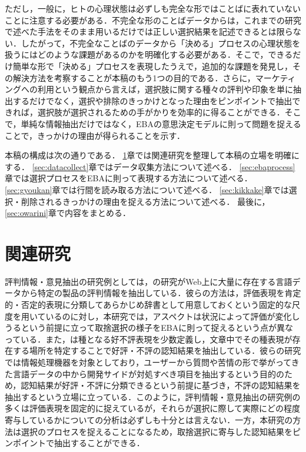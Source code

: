 \documentclass[japanese]{jnlp_1.3a}
\begin{document}
ただし，一般に，ヒトの心理状態は必ずしも完全な形ではことばに表れていないことに注意する必要がある．不完全な形のことばデータからは，これまでの研究で述べた手法をそのまま用いるだけでは正しい選択結果を記述できるとは限らない．したがって，不完全なことばのデータから「決める」プロセスの心理状態を扱うにはどのような課題があるのかを明確化する必要がある．そこで，できるだけ簡単な形で「決める」プロセスを表現したうえで，追加的な課題を発見し，その解決方法を考察することが本稿のもう1つの目的である．さらに，マーケティングへの利用という観点から言えば，選択肢に関する種々の評判や印象を単に抽出するだけでなく，選択や排除のきっかけとなった理由をピンポイントで抽出できれば，選択肢が選択されるための手がかりを効率的に得ることができる．そこで，単純な情報抽出だけではなく，EBAの意思決定モデルに則って問題を捉えることで，きっかけの理由が得られることを示す．

本稿の構成は次の通りである．
\ref{sec:kanren}章では関連研究を整理して本稿の立場を明確にする．
\ref{sec:datacollect}章ではデータ収集方法について述べる．
\ref{sec:ebaprocess}章では選択プロセスをEBAに則って表現する方法について述べる．
\ref{sec:gyoukan}章では行間を読み取る方法について述べる．
\ref{sec:kikkake}章では選択・削除されるきっかけの理由を捉える方法について述べる．
最後に，\ref{sec:owarini}章で内容をまとめる．

\section{関連研究}
\label{sec:kanren}

評判情報・意見抽出の研究例としては，の研究がWeb上に大量に存在する言語データから特定の製品の評判情報を抽出している．彼らの方法は，評価表現を肯定的・否定的表現に分類してあらかじめ辞書として用意しておくという固定的な尺度を用いているのに対し，本研究では，アスペクトは状況によって評価が変化しうるという前提に立って取捨選択の様子をEBAに則って捉えるという点が異なっている．また，は種となる好不評表現を少数定義し，文章中でその種表現が存在する場所を特定することで好評・不評の認知結果を抽出している．彼らの研究では情報処理機器を対象としており，ユーザーから質問や苦情の形で挙がってきた言語データの中から開発サイドが対処すべき項目を抽出するという目的のため，認知結果が好評・不評に分類できるという前提に基づき，不評の認知結果を抽出するという立場に立っている．このように，評判情報・意見抽出の研究例の多くは評価表現を固定的に捉えているが，それらが選択に際して実際にどの程度寄与しているかについての分析は必ずしも十分とは言えない．一方，本研究の方法は選択のプロセスを捉えることになるため，取捨選択に寄与した認知結果をピンポイントで抽出することができる．
\end{document}

